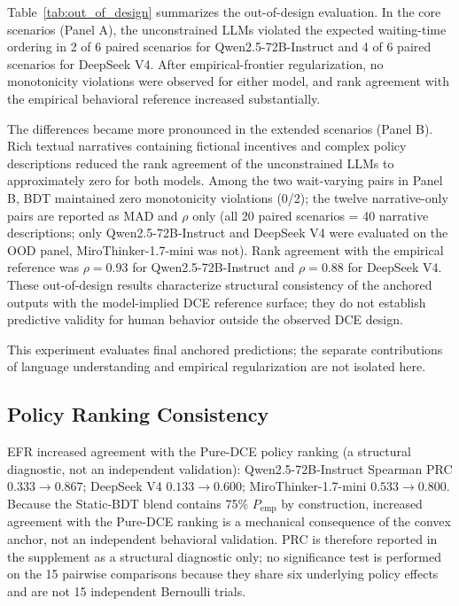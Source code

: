 \documentclass[11pt]{article}
\begin{document}
Table~\ref{tab:out_of_design} summarizes the out-of-design evaluation. In the core scenarios (Panel A), the unconstrained LLMs violated the expected waiting-time ordering in 2 of 6 paired scenarios for Qwen2.5-72B-Instruct and 4 of 6 paired scenarios for DeepSeek V4. After empirical-frontier regularization, no monotonicity violations were observed for either model, and rank agreement with the empirical behavioral reference increased substantially.

The differences became more pronounced in the extended scenarios (Panel B). Rich textual narratives containing fictional incentives and complex policy descriptions reduced the rank agreement of the unconstrained LLMs to approximately zero for both models. Among the two wait-varying pairs in Panel B, BDT maintained zero monotonicity violations (0/2); the twelve narrative-only pairs are reported as MAD and $\rho$ only (all 20 paired scenarios = 40 narrative descriptions; only Qwen2.5-72B-Instruct and DeepSeek V4 were evaluated on the OOD panel, MiroThinker-1.7-mini was not). Rank agreement with the empirical reference was $\rho = 0.93$ for Qwen2.5-72B-Instruct and $\rho = 0.88$ for DeepSeek V4. These out-of-design results characterize structural consistency of the anchored outputs with the model-implied DCE reference surface; they do not establish predictive validity for human behavior outside the observed DCE design.

This experiment evaluates final anchored predictions; the separate contributions of language understanding and empirical regularization are not isolated here.


\subsection{Policy Ranking Consistency}
\label{sec:policy_ranking}

EFR increased agreement with the Pure-DCE policy ranking (a structural diagnostic, not an independent validation): Qwen2.5-72B-Instruct Spearman PRC $0.333 \to 0.867$; DeepSeek V4 $0.133 \to 0.600$; MiroThinker-1.7-mini $0.533 \to 0.800$. Because the Static-BDT blend contains 75\% $P_{\text{emp}}$ by construction, increased agreement with the Pure-DCE ranking is a mechanical consequence of the convex anchor, not an independent behavioral validation. PRC is therefore reported in the supplement as a structural diagnostic only; no significance test is performed on the 15 pairwise comparisons because they share six underlying policy effects and are not 15 independent Bernoulli trials.
\end{document}
